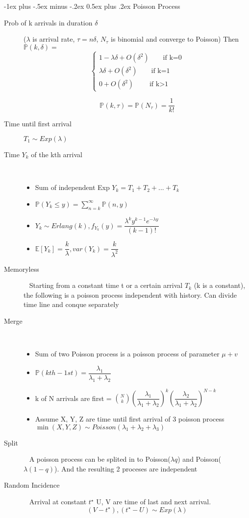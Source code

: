\documentclass[a4paper, 10pt,landscape]{article}
\makeatletter
\renewcommand{\section}{\@startsection{section}{1}{0mm}%
                                {-1ex plus -.5ex minus -.2ex}%
                                {0.5ex plus .2ex}%
                                {\normalfont\large\bfseries}}
\makeatother
\begin{document}
\begin{multicols*}{4}
\section{Poisson Process}
\begin{description}
	\item[Prob of k arrivals in duration $\delta$] ($\lambda$ is arrival rate, $\tau = n \delta$, $N_{\tau}$ is binomial and converge to Poisson) Then $\mathbb{P}(k, \delta)=$
		$$\begin{cases}
				1 - \lambda \delta + O(\delta^2) \qquad\text{if k=0}\\[10pt]
				\lambda \delta + O(\delta^2)\qquad \text{if k=1}\\[10pt]
				0 + O(\delta^2) \qquad \text{if k$>$1}
		\end{cases}$$

		$$\mathbb{P}(k,\tau) = \mathbb{P}(N_{\tau}) = \dfrac{1}{k!}$$

	\item[Time until first arrival] $T_1 \sim Exp(\lambda)$

	\item[Time $Y_k$ of the kth arrival]~
		\begin{itemize}
			\item Sum of independent Exp $Y_k = T_1 + T_2 + ... + T_k$
			\item $\mathbb{P}(Y_k \leq y) = \sum_{n=k}^{\infty}\mathbb{P}(n, y)$
			\item $Y_k \sim Erlang(k),  f_{Y_k}(y) = \dfrac{\lambda^k y^{k-1} e^{-\lambda y} }{(k-1)!}$
			\item $\mathbb{E}[Y_k] = \dfrac{k}{\lambda}, var(Y_k)=\dfrac{k}{\lambda^2}$
		\end{itemize}
	\item[Memoryless]~
		Starting from a constant time t or a certain arrival $T_k$ (k is a constant), the following is a poisson process independent with history. Can divide time line and conque separately
	\item[Merge]~
		\begin{itemize}
			\item Sum of two Poisson process is a poisson process of parameter $\mu + v$
			\item $\mathbb{P}(kth - 1st) = \dfrac{\lambda_1}{\lambda_1 + \lambda_2}$
			\item k of N arrivals are first = $\binom{N}{k}(\dfrac{\lambda_1}{\lambda_1 + \lambda_2})^k (\dfrac{\lambda_2}{\lambda_1 + \lambda_2})^{N-k}$
			\item Assume X, Y, Z are time until first arrival of 3 poisson process $\min(X, Y, Z) \sim Poisson(\lambda_1 + \lambda_2 + \lambda_3)$
		\end{itemize}
	\item[Split]~
		A poisson process can be splited in to Poisson($\lambda q$) and Poisson($\lambda (1-q)$). And the resulting 2 proceses are independent
	\item[Random Incidence]~ 
		Arrival at constant $t^{\star}$ U, V are time of last and next arrival.
		$$(V - t^{\star}) , (t^{\star} - U) \sim Exp(\lambda)$$
\end{description}



\end{multicols*}
\end{document}
